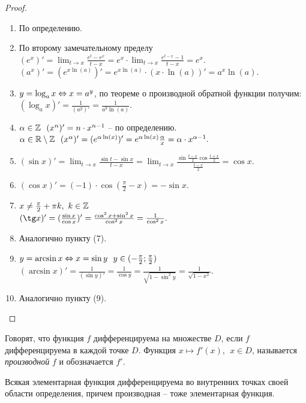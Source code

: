 \begin{proof}
    \begin{enumerate}
        \item По определению.
        \item По второму замечательному пределу $(e^{x})' = \lim_{t \to x} \frac{e^{t} - e^{x}}{t - x} = e^{x} \cdot \lim_{t \to x} \frac{e^{t - x} - 1}{t - x} = e^{x}.$\\
        $(a^{x})' = (e^{x \ln(a)})' = e^{x \ln(a)} \cdot (x \cdot \ln(a))' = a^{x} \ln(a).$
        \item $y = \log_{a}x \Leftrightarrow x = a^{y}$, по теореме о производной обратной функции получим: $(\log_{a}x)' = \frac{1}{(a^{y})'} = \frac{1}{a^{y} \ln(a)}.$
        \item $\alpha \in \mathbb{Z} \ \ (x^{n})' = n \cdot x^{n - 1}$ -- по определению. \\
        $\alpha \in \mathbb{R} \setminus \mathbb{Z} \ \ (x^{\alpha})' = (e^{\alpha \ln(x)})' = e^{\alpha \ln(x)} \frac{\alpha}{x} = \alpha \cdot x^{\alpha - 1}.$
        \item $(\sin x)' = \lim_{t \to x} \frac{\sin t - \sin x}{t - x} = \lim_{t \to x} \frac{\sin \frac{t - x}{2} \cos \frac{t + x}{2}}{\frac{t - x}{2}} = \cos x.$
        \item $(\cos x)' = (-1)\cdot \cos (\frac{\pi}{2} - x) = - \sin x.$
        \item $x \neq \frac{\pi}{2} + \pi k, \ k \in \mathbb{Z}$\\
        $(\tg x)' = (\frac{\sin x}{\cos x})' = \frac{\cos^{2}x + \sin^{2}x}{\cos^{2}x} = \frac{1}{\cos^{2}x}.$
        \item Аналогично пункту (7).
        \item $y = \arcsin x \Leftrightarrow x = \sin y \ \ y \in (-\frac{\pi}{2};\frac{\pi}{2})$\\
        $(\arcsin x)' = \frac{1}{(\sin y)'} = \frac{1}{\cos y} = \frac{1}{\sqrt{1 - \sin^{2}y}} = \frac{1}{\sqrt{1 - x^{2}}}.$
        \item Аналогично пункту (9).
    \end{enumerate}
\end{proof}

\begin{definition}
    Говорят, что функция $f$ дифференцируема на множестве $D$, если $f$ дифференцируема в каждой точке $D$. Функция $x \mapsto f'(x), \ \ x \in D$, называется \textit{производной} $f$ и обозначается $f'$. 
\end{definition}

\begin{corollary}
    Всякая элементарная функция дифференцируема во внутренних точках своей области определения, причем производная -- тоже элементарная функция.
\end{corollary}

